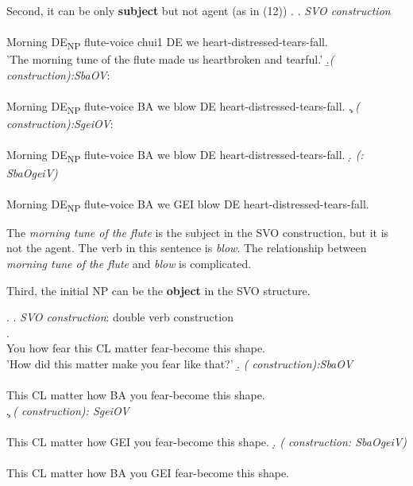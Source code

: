 \documentclass[12pt, oneside]{article}
\begin{document}
Second, it can be only \textbf{subject} but not agent (as in (12))
\ex. \a. \textit{SVO construction}\\
 \\
Morning DE\textsubscript{NP} flute-voice chui1 DE we heart-distressed-tears-fall.\\
'The morning tune of the flute made us heartbroken and tearful.'
    \b.\textit{( construction):SbaOV}:
\\
\\
Morning DE\textsubscript{NP} flute-voice BA we blow DE heart-distressed-tears-fall.
    \c. \textit{( construction):SgeiOV}:\\ \\
    Morning DE\textsubscript{NP} flute-voice BA we blow DE heart-distressed-tears-fall.
    \d. \textit{(: SbaOgeiV)}\\ \\
    Morning DE\textsubscript{NP} flute-voice BA we GEI blow DE heart-distressed-tears-fall.

The \textit{morning tune of the flute} is the subject in the SVO construction, but it is not the agent. The verb in this sentence is \textit{blow}. The relationship between \textit{morning tune of the flute} and \textit{blow} is complicated. 

\newline
Third, the initial NP can be the \textbf{object} in the SVO structure. 

\ex. \a. \textit{SVO construction}: double verb construction\\
.\\
You how fear this CL matter fear-become this shape.\\
'How did this matter make you fear like that?'
\b. \textit{( construction):SbaOV} \\
\\
This CL matter how BA you fear-become this shape.\\
\c. \textit{( construction): SgeiOV}\\
\\
This CL matter how GEI you fear-become this shape.
\d. \textit{( construction: SbaOgeiV)}\\
\\
This CL matter how BA you GEI fear-become this shape. 
\end{document}
